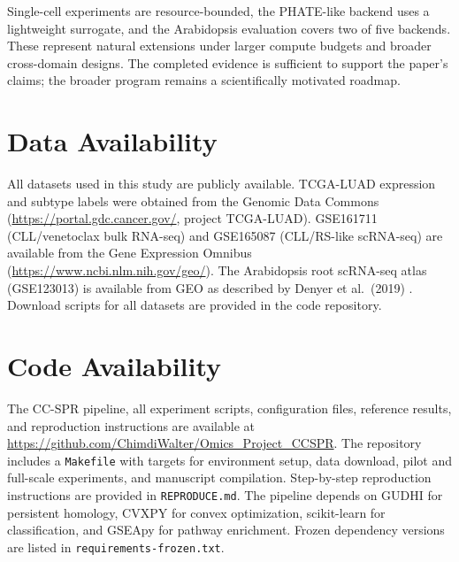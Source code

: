 \documentclass[11pt]{article}
\begin{document}
Single-cell experiments are resource-bounded, the PHATE-like backend uses a lightweight surrogate, and the Arabidopsis evaluation covers two of five backends.
These represent natural extensions under larger compute budgets and broader cross-domain designs.
The completed evidence is sufficient to support the paper's claims; the broader program remains a scientifically motivated roadmap.

\section*{Data Availability}

All datasets used in this study are publicly available.
TCGA-LUAD expression and subtype labels were obtained from the Genomic Data Commons (\url{https://portal.gdc.cancer.gov/}, project TCGA-LUAD).
GSE161711 (CLL/venetoclax bulk RNA-seq) and GSE165087 (CLL/RS-like scRNA-seq) are available from the Gene Expression Omnibus (\url{https://www.ncbi.nlm.nih.gov/geo/}).
The Arabidopsis root scRNA-seq atlas (GSE123013) is available from GEO as described by Denyer et al.\ (2019) \cite{denyer2019}.
Download scripts for all datasets are provided in the code repository.

\section*{Code Availability}

The CC-SPR pipeline, all experiment scripts, configuration files, reference results, and reproduction instructions are available at \url{https://github.com/ChimdiWalter/Omics_Project_CCSPR}.
The repository includes a \texttt{Makefile} with targets for environment setup, data download, pilot and full-scale experiments, and manuscript compilation.
Step-by-step reproduction instructions are provided in \texttt{REPRODUCE.md}.
The pipeline depends on GUDHI \cite{gudhi2014} for persistent homology, CVXPY for convex optimization, scikit-learn for classification, and GSEApy \cite{gseapy} for pathway enrichment.
Frozen dependency versions are listed in \texttt{requirements-frozen.txt}.
\end{document}
